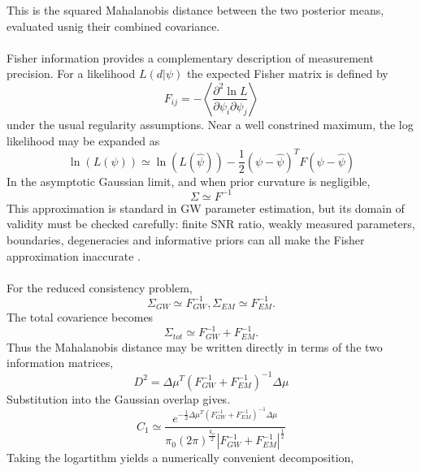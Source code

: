 \documentclass[pdflatex,sn-mathphys-num]{sn-jnl}%
\theoremstyle{thmstyleone}%
\theoremstyle{thmstyletwo}%
\theoremstyle{thmstylethree}%
\begin{document}
\begin{appendices}
\begin{equation}
\end{equation}
This is the squared Mahalanobis distance \cite{24} between the two posterior means, evaluated usnig their combined covariance.\\
\\
Fisher information provides a complementary description of measurement precision.
For a likelihood $L(d|\psi)$ the expected Fisher matrix is defined by \cite{25}
\begin{equation}
F_{ij}=-\left\langle \frac{\partial^2 \ln L}{\partial \psi_i \partial \psi_j} \right\rangle
\end{equation}
under the usual regularity assumptions.
Near a well constrined maximum, the log likelihood may be expanded as
\begin{equation}
\ln(L(\psi)) \simeq \ln(L(\hat\psi))-\frac{1}{2}(\psi-\hat\psi)^TF(\psi-\hat\psi)
\end{equation}
In the asymptotic Gaussian limit, and when prior curvature is negligible,
\begin{equation}
\Sigma \simeq F^{-1}
\end{equation}
This approximation is standard in GW parameter estimation, but its domain of validity must be checked carefully: finite SNR ratio, weakly measured parameters, boundaries, degeneracies and informative priors can all make the Fisher approximation inaccurate \cite{26}.\\
\\
For the reduced consistency problem,
\begin{equation}
\Sigma_{GW} \simeq F_{GW}^{-1},    \Sigma_{EM} \simeq F_{EM}^{-1}.
\end{equation}
The total covarience becomes
\begin{equation}
\Sigma_{tot} \simeq F_{GW}^{-1}+F_{EM}^{-1}.
\end{equation}
Thus the Mahalanobis distance may be written directly in terms of the two information matrices,
\begin{equation}
D^2 = \Delta\mu^T(F_{GW}^{-1}+F_{EM}^{-1})^{-1}\Delta\mu
\end{equation}
Substitution into the Gaussian overlap gives.
\begin{equation}
C_1 \simeq \frac{e^{-\frac{1}{2}\Delta\mu^T(F_{GW}^{-1}+F_{EM}^{-1})^{-1}\Delta\mu}}{\pi_0(2\pi)^{\frac{k_{\psi}}{2}}|F_{GW}^{-1}+F_{EM}^{-1}|^{\frac{1}{2}}}
\end{equation}
Taking the logartithm yields a numerically convenient decomposition,
\begin{equation}

\end{equation}
\end{appendices}
\end{document}
